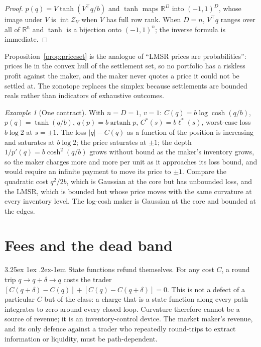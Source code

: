 \documentclass[11pt]{article}
\makeatletter
\renewcommand\paragraph{\@startsection{paragraph}{4}{\z@}%
  {3.25ex \@plus1ex \@minus.2ex}{-1em}%
  {\normalfont\normalsize\itshape}}
\theoremstyle{definition}
\theoremstyle{remark}
\newtheorem{example}[theorem]{Example}
\newcommand{\R}{\mathbb{R}}
\newcommand{\lcs}{\ell^{*}}
\newcommand{\artanh}{\operatorname{artanh}}
\newcommand{\inter}{\operatorname{int}}
\newcommand{\zono}{\mathcal{Z}}
\makeatother
\begin{document}
\begin{proof}
$p(q)=V\tanh(V^{\top}q/b)$ and $\tanh$ maps $\R^{D}$ into $(-1,1)^{D}$, whose image under $V$ is $\inter\zono_V$
when $V$ has full row rank. When $D=n$, $V^{\top}q$ ranges over all of $\R^{n}$ and $\tanh$ is a bijection onto
$(-1,1)^{n}$; the inverse formula is immediate.
\end{proof}

Proposition~\ref{prop:priceset} is the analogue of ``LMSR prices are probabilities'': prices lie in the convex hull of
the settlement set, so no portfolio has a riskless profit against the maker, and the maker never quotes a price it
could not be settled at. The zonotope replaces the simplex because settlements are bounded reals rather than
indicators of exhaustive outcomes.

\begin{example}[One contract]\label{ex:one}
With $n=D=1$, $v=1$: $C(q)=b\log\cosh(q/b)$, $p(q)=\tanh(q/b)$, $q(p)=b\artanh p$, $C^{*}(s)=b\lcs(s)$, worst-case
loss $b\log2$ at $s=\pm1$. The loss $|q|-C(q)$ as a function of the position is increasing and saturates at
$b\log2$; the price saturates at $\pm1$; the depth $1/p'(q)=b\cosh^{2}(q/b)$ grows without bound as the maker's
inventory grows, so the maker charges more and more per unit as it approaches its loss bound, and would require an
infinite payment to move its price to $\pm1$. Compare the quadratic cost $q^2/2b$, which is Gaussian at the core
but has unbounded loss, and the LMSR, which is bounded but whose price moves with the same curvature at every
inventory level. The log-cosh maker is Gaussian at the core and bounded at the edges.
\end{example}

\section{Fees and the dead band}\label{sec:fees}

\paragraph{State functions refund themselves.} For any cost $C$, a round trip $q\to q+\delta\to q$ costs the trader
$[C(q+\delta)-C(q)]+[C(q)-C(q+\delta)]=0$. This is not a defect of a particular $C$ but of the class: a charge that
is a state function along every path integrates to zero around every closed loop. Curvature therefore cannot be a
source of revenue; it is an inventory-control device. The market maker's revenue, and its only defence against a
trader who repeatedly round-trips to extract information or liquidity, must be path-dependent.
\end{document}
